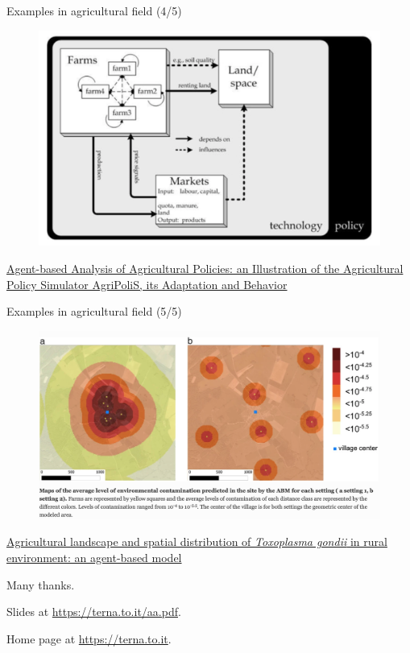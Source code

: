 \documentclass[9pt]{beamer}
\begin{document}
\begin{frame}{Examples in agricultural field (4/5)}

\begin{figure}[H]
\center
\includegraphics[scale=0.36]{agr4.png}
\label{agr4}
\end{figure}

\href{https://www.jstor.org/stable/26267800}{Agent-based Analysis of Agricultural Policies: an Illustration of the Agricultural Policy Simulator AgriPoliS, its Adaptation and Behavior}

\end{frame}

\begin{frame}{Examples in agricultural field (5/5)}

\begin{figure}[H]
\center
\includegraphics[scale=0.25]{agr5.png}
\label{agr5}
\end{figure}

\href{https://link.springer.com/article/10.1186/1476-072X-13-45}{Agricultural landscape and spatial distribution of \emph{Toxoplasma gondii} in rural environment: an agent-based model}

\end{frame}

\begin{frame}{}


Many thanks.

\bigskip

Slides at \url{https://terna.to.it/aa.pdf}.

\bigskip

Home page at \url{https://terna.to.it}.


\end{frame}
\end{document}
